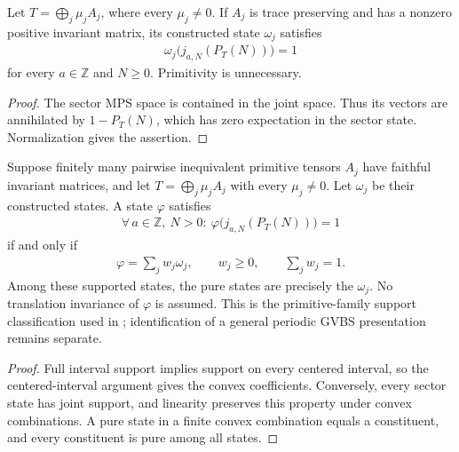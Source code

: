 \begin{lemma}
    \label{thm:sector_state_joint_mps_support}
    \leanok
    Let $T=\bigoplus_j\mu_j A_j$, where every $\mu_j\ne0$.
    If $A_j$ is trace preserving and has a nonzero positive invariant matrix,
    its constructed state $\omega_j$ satisfies
    \begin{align}
        \omega_j\bigl(j_{a,N}(P_T(N))\bigr)=1
    \end{align}
    for every $a\in\mathbb Z$ and $N\geq0$. Primitivity is unnecessary.
\end{lemma}
\begin{proof}\leanok
    The sector MPS space is contained in the joint space. Thus its vectors
    are annihilated by $1-P_T(N)$, which has zero expectation in the sector
    state. Normalization gives the assertion.
\end{proof}

\begin{lemma}
    \label{thm:primitive_joint_mps_supported_state_classification}
    \leanok
    Suppose finitely many pairwise inequivalent primitive tensors $A_j$
    have faithful invariant matrices, and let $T=\bigoplus_j\mu_j A_j$
    with every $\mu_j\ne0$. Let $\omega_j$ be their constructed states.
    A state $\varphi$ satisfies
    \begin{align}
        \forall\,a\in\mathbb Z,\ N>0:\ \varphi\bigl(j_{a,N}(P_T(N))\bigr)=1
    \end{align}
    if and only if
    \begin{align}
        \varphi=\sum_jw_j\omega_j,
        \qquad w_j\geq0,\qquad\sum_jw_j=1.
    \end{align}
    Among these supported states, the pure states are precisely the
    $\omega_j$. No translation invariance of $\varphi$ is assumed.
    This is the primitive-family support classification used in
    \cite[Theorem~1.1 and Section~3]{Nachtergaele1996Spectral}; identification
    of a general periodic GVBS presentation remains separate.
\end{lemma}
\begin{proof}\leanok
    Full interval support implies support on every centered interval, so
    the centered-interval argument gives the convex coefficients.
    Conversely, every sector state has joint support, and linearity
    preserves this property under convex combinations. A pure state in a
    finite convex combination equals a constituent, and every constituent
    is pure among all states.
\end{proof}

